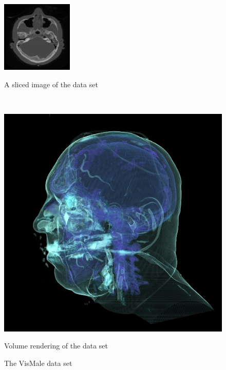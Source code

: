 \begin{figure}
\centering
\begin{minipage}{.25\textwidth}
\includegraphics[width=1\linewidth]{images/VisMale_slice.jpg}
\caption{A sliced image of the data set}
\label{fig:VisMale_slice}
\end{minipage}~
\begin{minipage}{.25\textwidth}
\includegraphics[width=1\linewidth]{images/VisMale.jpg}
\caption{Volume rendering of the data set}
\label{fig:VisMale}
\end{minipage}
\caption{The VisMale data set \cite{website:Roettger_volume_2013}}
\label{fig:multiple_VisMale}
\end{figure}

